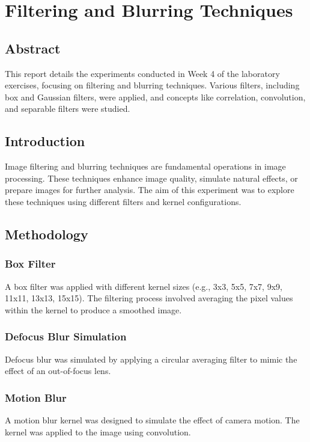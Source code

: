 \documentclass{report}
\begin{document}
\chapter{Filtering and Blurring Techniques}

\section{Abstract}
This report details the experiments conducted in Week 4 of the laboratory exercises, focusing on filtering and blurring techniques. Various filters, including box and Gaussian filters, were applied, and concepts like correlation, convolution, and separable filters were studied.

\section{Introduction}
Image filtering and blurring techniques are fundamental operations in image processing. These techniques enhance image quality, simulate natural effects, or prepare images for further analysis. The aim of this experiment was to explore these techniques using different filters and kernel configurations.

\section{Methodology}

\subsection{Box Filter}
A box filter was applied with different kernel sizes (e.g., 3x3, 5x5, 7x7, 9x9, 11x11, 13x13, 15x15). The filtering process involved averaging the pixel values within the kernel to produce a smoothed image.

\subsection{Defocus Blur Simulation}
Defocus blur was simulated by applying a circular averaging filter to mimic the effect of an out-of-focus lens.

\subsection{Motion Blur}
A motion blur kernel was designed to simulate the effect of camera motion. The kernel was applied to the image using convolution.
\end{document}
